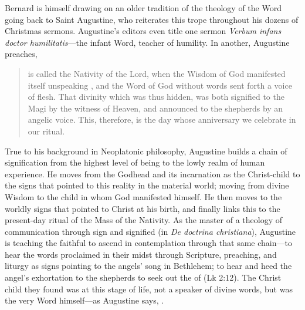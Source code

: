 Bernard is himself drawing on an older tradition of the theology of the Word
going back to Saint Augustine, who reiterates this trope throughout his dozens of
Christmas sermons.
Augustine's editors even title one sermon \emph{Verbum infans doctor
humilitatis}---the infant Word, teacher of humility.%
    \Autocite[1004, heading for sermon 187]{Augustine:SermonesPL}
In another, Augustine preaches,
\begin{quote}
     is called the Nativity of the Lord, when the Wisdom of God
    manifested itself unspeaking , and the Word of God without
    words sent forth a voice of flesh.
    That divinity which was thus hidden, was both signified to the Magi by the
    witness of Heaven, and announced to the shepherds by an angelic voice.
    This, therefore, is the day whose anniversary we celebrate in our ritual.%
        \Autocite
        [997, Sermo 185, In Natali Domini 2: .]
        {Augustine:SermonesPL}
\end{quote}
True to his background in Neoplatonic philosophy, Augustine builds a chain of
signification from the highest level of being to the lowly realm of human
experience.
He moves from the Godhead and its incarnation as the Christ-child to the signs
that pointed to this reality in the material world; moving from divine Wisdom to
the child in whom God manifested himself.
He then moves to the worldly signs that pointed to Christ at his birth, and
finally links this to the present-day ritual of the Mass of the Nativity.
As the master of a theology of communication through sign and signified (in
\emph{De doctrina christiana}), Augustine is teaching the faithful to ascend in
contemplation through that same chain---to hear the words proclaimed in their
midst through Scripture, preaching, and liturgy as signs pointing to the angels'
song in Bethlehem; to hear and heed the angel's exhortation to the shepherds to
seek out the  of  (Lk 2:12).
The Christ child they found was at this  stage of life, not a
speaker of divine words, but was the very Word himself---as Augustine says,
.

